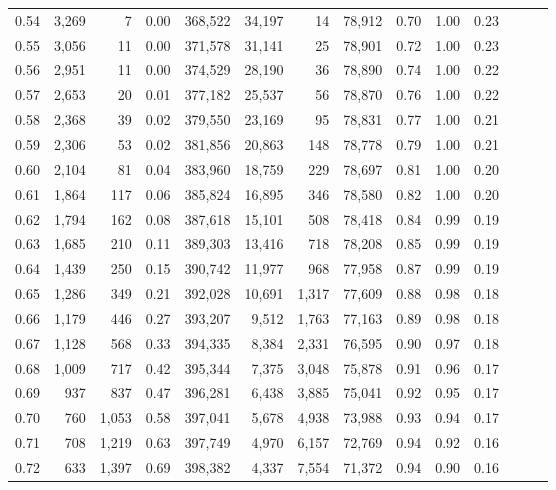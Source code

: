 \begin{tabular}{rrrrrrrrrrrrrr}
0.54 &  3,269 &      7 &  0.00 &  368,522 &   34,197 &      14 &  78,912 &  0.70 &  1.00 &      0.23 \\
0.55 &  3,056 &     11 &  0.00 &  371,578 &   31,141 &      25 &  78,901 &  0.72 &  1.00 &      0.23 \\
0.56 &  2,951 &     11 &  0.00 &  374,529 &   28,190 &      36 &  78,890 &  0.74 &  1.00 &      0.22 \\
0.57 &  2,653 &     20 &  0.01 &  377,182 &   25,537 &      56 &  78,870 &  0.76 &  1.00 &      0.22 \\
0.58 &  2,368 &     39 &  0.02 &  379,550 &   23,169 &      95 &  78,831 &  0.77 &  1.00 &      0.21 \\
0.59 &  2,306 &     53 &  0.02 &  381,856 &   20,863 &     148 &  78,778 &  0.79 &  1.00 &      0.21 \\
0.60 &  2,104 &     81 &  0.04 &  383,960 &   18,759 &     229 &  78,697 &  0.81 &  1.00 &      0.20 \\
0.61 &  1,864 &    117 &  0.06 &  385,824 &   16,895 &     346 &  78,580 &  0.82 &  1.00 &      0.20 \\
0.62 &  1,794 &    162 &  0.08 &  387,618 &   15,101 &     508 &  78,418 &  0.84 &  0.99 &      0.19 \\
0.63 &  1,685 &    210 &  0.11 &  389,303 &   13,416 &     718 &  78,208 &  0.85 &  0.99 &      0.19 \\
0.64 &  1,439 &    250 &  0.15 &  390,742 &   11,977 &     968 &  77,958 &  0.87 &  0.99 &      0.19 \\
0.65 &  1,286 &    349 &  0.21 &  392,028 &   10,691 &   1,317 &  77,609 &  0.88 &  0.98 &      0.18 \\
0.66 &  1,179 &    446 &  0.27 &  393,207 &    9,512 &   1,763 &  77,163 &  0.89 &  0.98 &      0.18 \\
0.67 &  1,128 &    568 &  0.33 &  394,335 &    8,384 &   2,331 &  76,595 &  0.90 &  0.97 &      0.18 \\
0.68 &  1,009 &    717 &  0.42 &  395,344 &    7,375 &   3,048 &  75,878 &  0.91 &  0.96 &      0.17 \\
0.69 &    937 &    837 &  0.47 &  396,281 &    6,438 &   3,885 &  75,041 &  0.92 &  0.95 &      0.17 \\
0.70 &    760 &  1,053 &  0.58 &  397,041 &    5,678 &   4,938 &  73,988 &  0.93 &  0.94 &      0.17 \\
0.71 &    708 &  1,219 &  0.63 &  397,749 &    4,970 &   6,157 &  72,769 &  0.94 &  0.92 &      0.16 \\
0.72 &    633 &  1,397 &  0.69 &  398,382 &    4,337 &   7,554 &  71,372 &  0.94 &  0.90 &      0.16 \\

\end{tabular}
